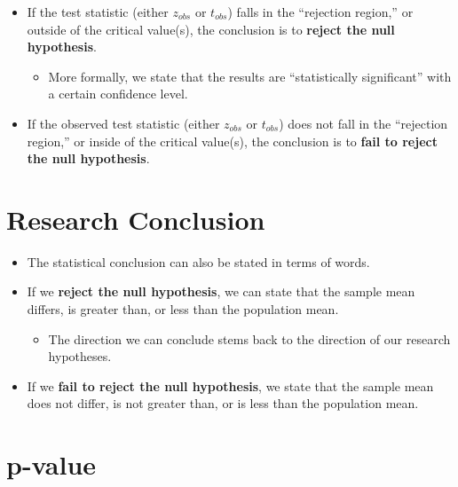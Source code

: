 \documentclass[12pt]{article}
\begin{document}
\begin{itemize}
\itemsep1pt\parskip0pt
\item
  If the test statistic (either \(z_{obs}\) or \(t_{obs}\)) falls in the
  ``rejection region,'' or outside of the critical value(s), the
  conclusion is to \textbf{reject the null hypothesis}.

  \begin{itemize}
  \itemsep1pt\parskip0pt
  \item
    More formally, we state that the results are ``statistically
    significant'' with a certain confidence level.
  \end{itemize}
\item
  If the observed test statistic (either \(z_{obs}\) or \(t_{obs}\))
  does not fall in the ``rejection region,'' or inside of the critical
  value(s), the conclusion is to \textbf{fail to reject the null
  hypothesis}.
\end{itemize}

\section{Research Conclusion}\label{research-conclusion}

\begin{itemize}
\itemsep1pt\parskip0pt
\item
  The statistical conclusion can also be stated in terms of words.
\item
  If we \textbf{reject the null hypothesis}, we can state that the
  sample mean differs, is greater than, or less than the population
  mean.

  \begin{itemize}
  \itemsep1pt\parskip0pt
  \item
    The direction we can conclude stems back to the direction of our
    research hypotheses.
  \end{itemize}
\item
  If we \textbf{fail to reject the null hypothesis}, we state that the
  sample mean does not differ, is not greater than, or is less than the
  population mean.
\end{itemize}

\section{p-value}\label{p-value}
\end{document}

